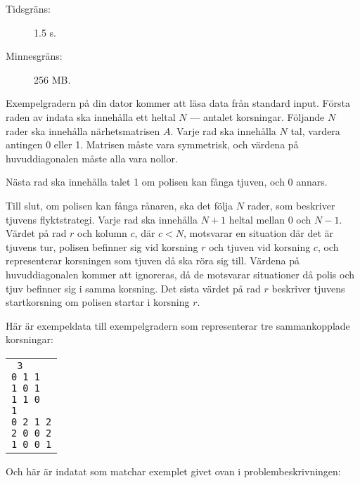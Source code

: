 \documentclass{boi2014-se}
\begin{document}
    \begin{description}
        \item[Tidsgräns:] 1.5 s.
        \item[Minnesgräns:] 256 MB.
    \end{description}

    \Experimentation
    Exempelgradern på din dator kommer att läsa data från standard input.
    Första raden av indata ska innehålla ett heltal $N$ --- antalet korsningar.
    Följande $N$ rader ska innehålla närhetsmatrisen $A$. Varje rad ska
    innehålla $N$ tal, vardera antingen 0 eller 1. Matrisen måste vara
    symmetrisk, och värdena på huvuddiagonalen måste alla vara nollor.

    Nästa rad ska innehålla talet 1 om polisen kan fånga tjuven, och 0 annars.

    Till slut, om polisen kan fånga rånaren, ska det följa $N$ rader, som beskriver
    tjuvens flyktstrategi. Varje rad ska innehålla $N+1$ heltal mellan 0 och $N-1$.
    Värdet på rad $r$ och kolumn $c$, där $c < N$, motsvarar en situation där det
    är tjuvens tur, polisen befinner sig vid korsning $r$ och tjuven vid korsning $c$,
    och representerar korsningen som tjuven då ska röra sig till. Värdena på
    huvuddiagonalen kommer att ignoreras, då de motsvarar situationer då polis
    och tjuv befinner sig i samma korsning. Det sista värdet på rad $r$ beskriver
    tjuvens startkorsning om polisen startar i korsning $r$.
    
    Här är exempeldata till exempelgradern som representerar tre sammankopplade
    korsningar:

    \begin{center}
        \begin{tabular}{p{4cm}}
            {\tt
                3 \newline
                0 1 1 \newline
                1 0 1 \newline
                1 1 0 \newline
                1 \newline
                0 2 1 2 \newline
                2 0 0 2 \newline
                1 0 0 1 \newline
            }
        \end{tabular}
    \end{center}

    Och här är indatat som matchar exemplet givet ovan i problembeskrivningen:
\end{document}
